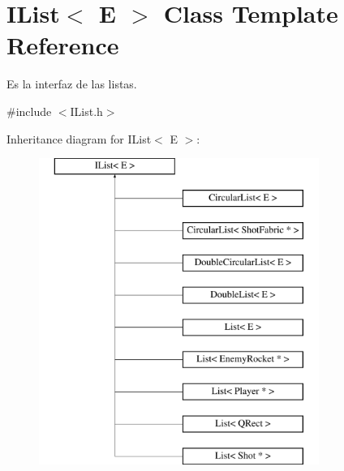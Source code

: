 \hypertarget{class_i_list}{\section{I\-List$<$ E $>$ Class Template Reference}
\label{class_i_list}
}


Es la interfaz de las listas.  




{\ttfamily \#include $<$I\-List.\-h$>$}

Inheritance diagram for I\-List$<$ E $>$\-:\begin{figure}[H]
\begin{center}
\leavevmode
\includegraphics[height=10.000000cm]{class_i_list}
\end{center}
\end{figure}
